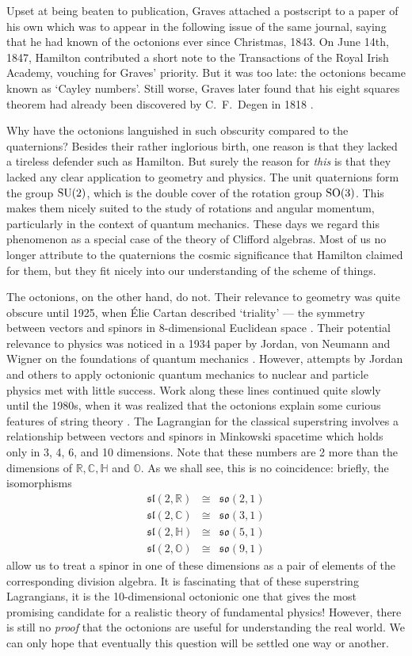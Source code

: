 \documentclass[12pt]{article}
\newcommand\R{{\mathbb R}}
\newcommand\C{{\mathbb C}}
\renewcommand\H{{\mathbb H}}
\renewcommand\O{{\mathbb O}}
\newcommand{\SO}{{\rm SO}}
\newcommand{\SU}{{\rm SU}}
\newcommand{\so}{{\mathfrak {so}}}
\newcommand{\Sl}{{\mathfrak {sl}}}
\newcommand{\iso}{\cong}
\begin{document}
Upset at being beaten to publication, Graves attached a postscript to a
paper of his own which was to appear in the following issue of the same
journal, saying that he had known of the octonions ever since Christmas,
1843.  On June 14th, 1847, Hamilton contributed a short note to the
Transactions of the Royal Irish Academy, vouching for Graves' priority. 
But it was too late: the octonions became known as `Cayley numbers'. 
Still worse, Graves later found that his eight squares theorem had
already been discovered by C.\ F.\ Degen in 1818 \cite{Curtis,Dickson}.

Why have the octonions languished in such obscurity compared to the
quaternions?  Besides their rather inglorious birth, one reason is that
they lacked a tireless defender such as Hamilton.  But surely the reason
for {\it this} is that they lacked any clear application to geometry and
physics.  The unit quaternions form the group $\SU(2)$, which is the
double cover of the rotation group $\SO(3)$.  This makes them nicely
suited to the study of rotations and angular momentum, particularly in
the context of quantum mechanics.  These days we regard this phenomenon
as a special case of the theory of Clifford algebras.  Most of us no
longer attribute to the quaternions the cosmic significance that
Hamilton claimed for them, but they fit nicely into our understanding of
the scheme of things.
 
The octonions, on the other hand, do not.  Their relevance to geometry
was quite obscure until 1925, when \'Elie Cartan described `triality'
--- the symmetry between vectors and spinors in 8-dimensional Euclidean
space \cite{Cartan3}.  Their potential relevance to physics was noticed
in a 1934 paper by Jordan, von Neumann and Wigner on the foundations of
quantum mechanics \cite{JNW}.  However, attempts by Jordan and others to
apply octonionic quantum mechanics to nuclear and particle physics met
with little success.  Work along these lines continued quite slowly
until the 1980s, when it was realized that the octonions explain some
curious features of string theory \cite{KT}.  The Lagrangian for
the classical superstring involves a relationship between vectors and
spinors in Minkowski spacetime which holds only in 3, 4, 6, and 10
dimensions.  Note that these numbers are 2 more than the dimensions of
$\R,\C,\H$ and $\O$.  As we shall see, this is no coincidence: briefly, 
the isomorphisms 
\[ \begin{array}{lcl}
          \Sl(2,\R) &\iso& \so(2,1)   \\
          \Sl(2,\C) &\iso& \so(3,1)   \\   
          \Sl(2,\H) &\iso& \so(5,1)   \\
          \Sl(2,\O) &\iso& \so(9,1)   
\end{array}
\]
allow us to treat a spinor in one of these dimensions as a pair of   
elements of the corresponding division algebra.  It is fascinating   
that of these superstring Lagrangians, it is the 10-dimensional
octonionic one that gives the most promising candidate for a realistic
theory of fundamental physics!  However, there is still no {\it proof}
that the octonions are useful for understanding the real world.  We
can only hope that eventually this question will be settled one way or
another.
\end{document}

